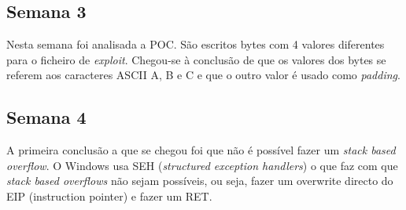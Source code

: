 \documentclass[a4paper]{article}
\begin{document}
\subsection{Semana 3}



Nesta semana foi analisada a POC. São escritos bytes com 4 valores diferentes para o ficheiro de \textit{exploit}. Chegou-se à conclusão de que os valores dos bytes se referem aos caracteres ASCII A, B e C e que o outro valor é usado como \textit{padding}.

\subsection{Semana 4}

A primeira conclusão a que se chegou foi que não é possível fazer um \textit{stack based overflow}. O Windows usa SEH (\textit{structured exception handlers}) o que faz com que \textit{stack based overflows} não sejam possíveis, ou seja, fazer um overwrite directo do EIP (instruction pointer) e fazer um RET.
\end{document}
